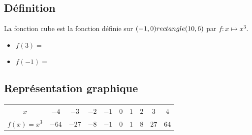 \subsection{Définition}
  \begin{minipage}[c]{0.6\linewidth}
\begin{Définition}
La fonction cube est la fonction définie sur $(-1,0) rectangle (10,6)$ par $f:x\mapsto x^3$.
\end{Définition}
  \end{minipage} \hfill
  \begin{minipage}[c]{0.33\linewidth}
  \begin{Exemple}
  \leavevmode\vspace{-\baselineskip}
\begin{itemize}[label=\textcolor{Couleur8}{$\bullet$}]
\item $f(3)=$ \ligne 
\item $f(-1)=$ \ligne 
\end{itemize}
\end{Exemple}
  \end{minipage}


\subsection{Représentation graphique}
\begin{center}

\begin{tabular}{|c|c|c|c|c|c|c|c|c|c|}
\arrayrulecolor{Couleur6} \hline
$x$ & $-4$ & $-3$ & $-2$ & $-1$ & $0$ & $1$ & $2$ & $3$ & $4$\\
\hline
$f(x)=x^3$ & $-64$ & $-27$ & $-8$ & $-1$ & $0$ & $1$ & $8$ & $27$ & $64$\\
\hline

\end{tabular}
\end{center}

